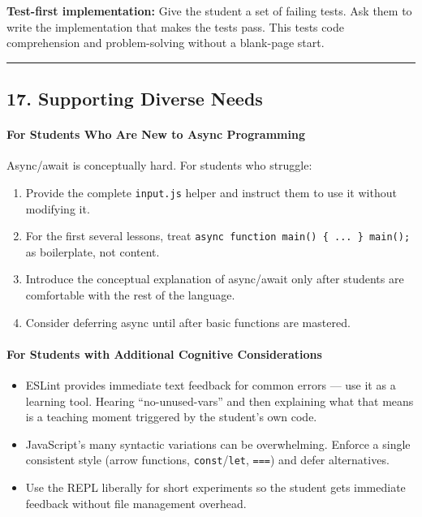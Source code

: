 \documentclass[
  justified,
  openright,
]{tufte-book}
\let\subsubsection\paragraph
\let\paragraph\paragraph
\let\subsubsection\paragraph
\let\paragraph\paragraph
\providecommand{\tightlist}{%
  \setlength{\itemsep}{0pt}\setlength{\parskip}{0pt}}
\begin{document}
\textbf{Test-first implementation:} Give the student a set of failing
tests. Ask them to write the implementation that makes the tests pass.
This tests code comprehension and problem-solving without a blank-page
start.

\begin{center}\rule{0.5\linewidth}{0.5pt}\end{center}

\subsection{17. Supporting Diverse
Needs}\label{supporting-diverse-needs}

\subsubsection{For Students Who Are New to Async
Programming}\label{for-students-who-are-new-to-async-programming}

Async/await is conceptually hard. For students who struggle:

\begin{enumerate}
\def\labelenumi{\arabic{enumi}.}
\tightlist
\item
  Provide the complete \texttt{input.js} helper and instruct them to use
  it without modifying it.
\item
  For the first several lessons, treat
  \texttt{async\ function\ main()\ \{\ ...\ \}\ main();} as boilerplate,
  not content.
\item
  Introduce the conceptual explanation of async/await only after
  students are comfortable with the rest of the language.
\item
  Consider deferring async until after basic functions are mastered.
\end{enumerate}

\subsubsection{For Students with Additional Cognitive
Considerations}\label{for-students-with-additional-cognitive-considerations}

\begin{itemize}
\tightlist
\item
  ESLint provides immediate text feedback for common errors --- use it
  as a learning tool. Hearing ``no-unused-vars'' and then explaining
  what that means is a teaching moment triggered by the student's own
  code.
\item
  JavaScript's many syntactic variations can be overwhelming. Enforce a
  single consistent style (arrow functions, \texttt{const}/\texttt{let},
  \texttt{===}) and defer alternatives.
\item
  Use the REPL liberally for short experiments so the student gets
  immediate feedback without file management overhead.
\end{itemize}
\end{document}

